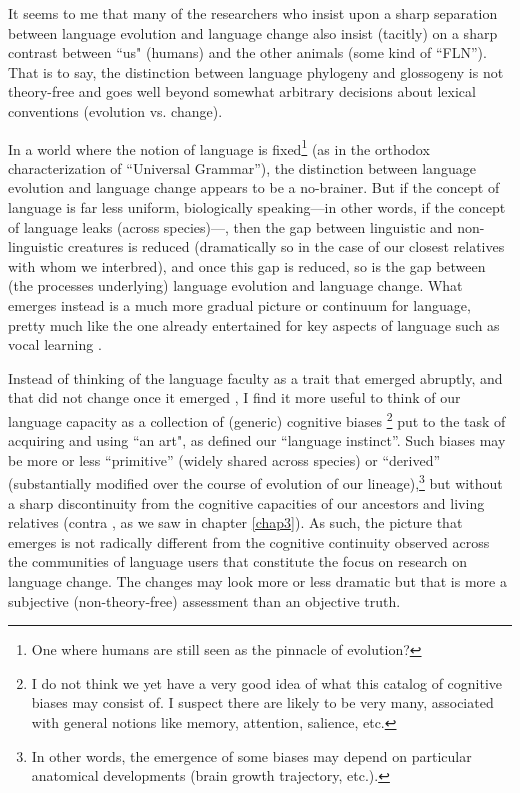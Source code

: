 It seems to me that many of the researchers who insist upon a sharp separation between language evolution and language change also insist (tacitly) on a sharp contrast between ``us" (humans) and the other animals (some kind of ``FLN''). That is to say, the distinction between language phylogeny and glossogeny is not theory-free and goes well beyond somewhat arbitrary decisions about lexical conventions (evolution vs. change).

In a world where the notion of language is fixed\footnote{One where humans are still seen as the pinnacle of evolution?} (as in the orthodox characterization of ``Universal Grammar''), the distinction between language evolution and language change appears to be a no-brainer. But if the concept of language is far less uniform, biologically speaking---in other words, if the concept of language leaks (across species)---, then the gap between linguistic and non-linguistic creatures is reduced (dramatically so in the case of our closest relatives with whom we interbred), and once this gap is reduced, so is the gap between (the processes underlying) language evolution and language change. What emerges instead is a much more gradual picture or continuum for language, pretty much like the one already entertained for key aspects of language such as vocal learning \citep{petkov2012birds,martins2020vocal}.

Instead of thinking of the language faculty as a trait that emerged abruptly, and that did not change once it emerged \citep{berwick2016only}, I find it more useful to think of our language capacity as a collection of (generic) cognitive biases
\citep{christiansen2016creating,gervain2010speech}\footnote{I do not think we yet have a very good idea of what this catalog of cognitive biases may consist of. I suspect there are likely to be very many, associated with general notions like memory, attention, salience, etc.} put to the task of acquiring and using ``an art", as \cite{darwindescent} defined our ``language instinct''. Such biases may be more or less ``primitive'' (widely shared across species) or ``derived'' (substantially modified over the course of evolution of our lineage),\footnote{In other words, the emergence of some biases may depend on particular anatomical developments (brain growth trajectory, etc.).} but without a sharp discontinuity from the cognitive capacities of our ancestors and living relatives (contra \cite{hauser2002faculty}, as we saw in chapter \ref{chap3}). As such, the picture that emerges is not radically different from the cognitive continuity observed across the communities of language users that constitute the focus on research on language change. The changes may look more or less dramatic but that is more a subjective (non-theory-free) assessment than an objective truth.

